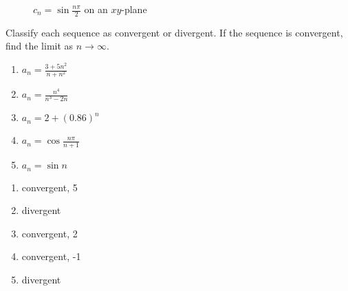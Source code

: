 \begin{figure}[htbp]
\centering
    \caption{$c_n =\sin{\frac{n\pi}{2}}$ on an $xy$-plane}
    \label{fig:sineseq}
\end{figure}

\begin{Exercise}[label=seqcalc3]
Classify each sequence as convergent or divergent. If the sequence is 
convergent, find the limit as $n \to \infty$.
\begin{enumerate}
\item $a_n = \frac{3 + 5n^2}{n + n^2}$
\item $a_n = \frac{n^4}{n^3 - 2n}$
\item $a_n = 2 + (0.86)^n$
\item $a_n = \cos{\frac{n\pi}{n+1}}$
\item $a_n = \sin{n}$
\end{enumerate}
\end{Exercise}

\begin{Answer}[ref=seqcalc3]
\begin{enumerate}
\item convergent, 5
\item divergent
\item convergent, 2
\item convergent, -1
\item divergent
\end{enumerate}
\end{Answer}

